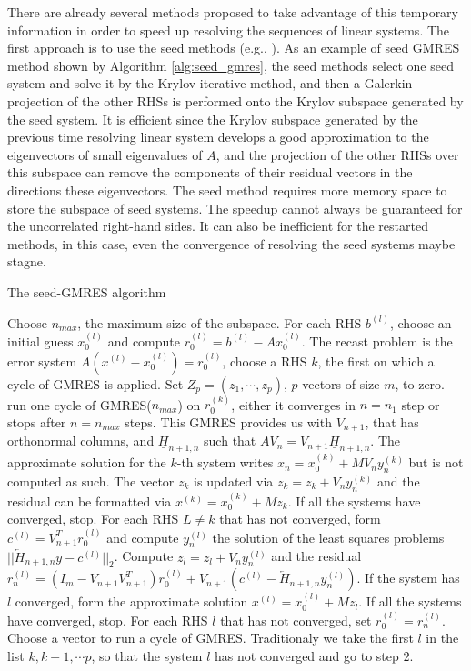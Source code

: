 There are already several methods proposed to take advantage of this temporary information in order to speed up resolving the sequences of linear systems. The first approach is to use the seed methods (e.g., \cite{saad1987lanczos,papadrakakis1990new,smith1989conjugate,gu2002seed,simoncini1995iterative,abdel2014improved}). As an example of seed GMRES method shown by Algorithm \ref{alg:seed_gmres}, the seed methods select one seed system and solve it by the Krylov iterative method, and then a Galerkin projection of the other RHSs is performed onto the Krylov subspace generated by the seed system. It is efficient since the Krylov subspace generated by the previous time resolving linear system develops a good approximation to the eigenvectors of small eigenvalues of $A$, and the projection of the other RHSs over this subspace can remove the components of their residual vectors in the directions these eigenvectors. The seed method requires more memory space to store the subspace of seed systems. The speedup cannot always be guaranteed for the uncorrelated right-hand sides. It can also be inefficient for the restarted methods, in this case, even the convergence of resolving the seed systems maybe stagne. 

\begin{algorithm}[htbp]{}
	\caption{The seed-GMRES algorithm}   
	\label{alg:seed_gmres}   
	\begin{algorithmic}[1]
		\State Choose $n_{max}$, the maximum size of the subspace. For each RHS $b^{(l)}$, choose an initial guess $x_0^{(l)}$ and compute $r_0^{(l)} = b^{(l)}-Ax_0^{(l)}$. The recast problem is the error system $A(x^{(l)}-x_0^{(l)})=r_0^{(l)}$, choose a RHS $k$, the first on which a cycle of GMRES is applied. Set $Z_p=(z_1,\cdots, z_p)$, $p$ vectors of size $m$, to zero.
		\State run one cycle of GMRES($n_{max}$) on $r_0^{(k)}$, either it converges in $n=n_1$ step or stops after $n=n_{max}$ steps. This GMRES provides us with $V_{n+1}$, that has orthonormal columns, and $\underline{H}_{n+1,n}$ such that $AV_n=V_{n+1}\underline{H}_{n+1,n}$. The approximate solution for the $k$-th system writes $x_n=x_0^{(k)}+MV_ny_n^{(k)}$ but is not computed as such. The vector $z_k$ is updated via $z_k=z_k+V_ny_n^{(k)}$ and the residual can be formatted via $x^{(k)}=x_0^{(k)}+Mz_k$. If all the systems have converged, stop.
		\State For each RHS $L \neq k$ that has not converged, form $c^{(l)}= V_{n+1}^Tr_0^{(l)}$ and compute $y_n^{(l)}$ the solution of the least squares problems $||\underleftarrow{H}_{n+1,n}y-c^{(l)}||_2$. Compute $z_l=z_l+V_ny_n^{(l)}$ and the residual $r_n^{(l)}=(I_m-V_{n+1}V_{n+1}^T)r_0^{(l)}+V_{n+1}(c^{(l)}-\underleftarrow{H}_{n+1,n}y_n^{(l)})$. If the system has $l$ converged, form the approximate solution $x^{(l)}=x_0^{(l)}+Mz_l$. If all the systems have converged, stop.
		\State For each RHS $l$ that has not converged, set $r_0^{(l)}=r_n^{(l)}$. Choose a vector to run a cycle of GMRES. Traditionaly we take the first $l$ in the list $k, k+1, \cdots p$, so that the system $l$ has not converged and go to step $2$. 
	\end{algorithmic}  
\end{algorithm}

